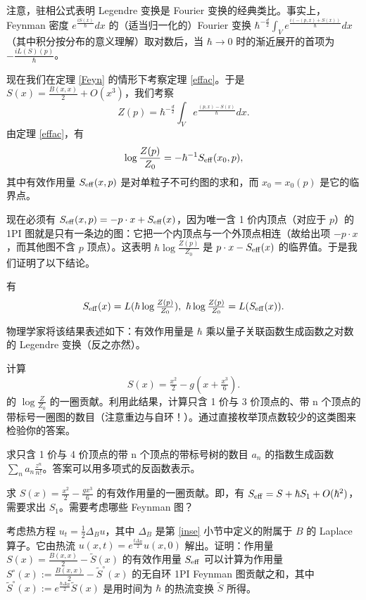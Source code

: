 注意，驻相公式表明 Legendre 变换是 Fourier 变换的经典类比。事实上，Feynman 密度 $e^{\frac{iS(x)}{\hbar}}dx$ 的（适当归一化的）Fourier 变换 $\hbar^{-\frac{d}{2}}\int_V e^{\frac{i(-(p,x)+S(x))}{\hbar}}dx$（其中积分按分布的意义理解）取对数后，当 $\hbar\to 0$ 时的渐近展开的首项为 $-\frac{iL(S)(p)}{\hbar}$。

现在我们在定理 \ref{Feyn} 的情形下考察定理 \ref{effac}。于是 $S(x)=\frac{B(x,x)}{2}+O(x^3)$，我们考察
$$
Z(p)=\hbar^{-\frac{d}{2}}\int_Ve^{\frac{(p,x)-S(x)}{\hbar}}dx.
$$
由定理 \ref{effac}，有
$$
\log\frac{Z(p)}{Z_0}=-\hbar^{-1}S_{\rm eff}(x_0,p),
$$
其中有效作用量 $S_{\rm eff}(x,p)$ 是对单粒子不可约图的求和，而 $x_0=x_0(p)$ 是它的临界点。

现在必须有 $S_{\rm eff}(x,p)=-p\cdot x+S_{\rm eff}(x)$，因为唯一含 1 价内顶点（对应于 $p$）的 1PI 图就是只有一条边的图：它把一个内顶点与一个外顶点相连（故给出项 $-p\cdot x$，而其他图不含 $p$ 顶点）。这表明 $\hbar\log\frac{Z(p)}{Z_0}$ 是 $p\cdot x-S_{\rm eff}(x)$ 的临界值。于是我们证明了以下结论。

\begin{proposition} 有
$$
S_{\rm eff}(x)=L(\hbar\log\tfrac{Z(p)}{Z_0}),\ \hbar\log\tfrac{Z(p)}{Z_0}=L(S_{\rm eff}(x)).
$$
\end{proposition}

物理学家将该结果表述如下：有效作用量是 $\hbar$ 乘以量子关联函数生成函数之对数的 Legendre 变换（反之亦然）。

\begin{exercise} 计算
$$
S(x)=\tfrac{x^2}{2}-g(x+\tfrac{x^3}{6}).
$$
的 $\log\frac{Z}{Z_0}$ 的一圈贡献。利用此结果，计算只含 1 价与 3 价顶点的、带 n 个顶点的带标号一圈图的数目（注意重边与自环！）。通过直接枚举顶点数较少的这类图来检验你的答案。
\end{exercise}

\begin{exercise}
求只含 1 价与 4 价顶点的带 n 个顶点的带标号树的数目 $a_n$ 的指数生成函数 $\sum_n a_n\frac{z^n}{n!}$。答案可以用多项式的反函数表示。
\end{exercise}

\begin{exercise} 求 $S(x)=\frac{x^2}{2}-\frac{gx^3}{6}$ 的有效作用量的一圈贡献。即，有 $S_{\rm eff}=S+\hbar S_1+O(\hbar^2)$，需要求出 $S_1$。需要考虑哪些 Feynman 图？
\end{exercise}

\begin{exercise} 考虑热方程 $u_t=\frac{1}{2}\Delta_B u$，其中 $\Delta_B$ 是第 \ref{inse} 小节中定义的附属于 $B$ 的 Laplace 算子。它由热流 $u(x,t)=e^{\frac{t\Delta_B}{2}}u(x,0)$ 解出。证明：作用量 $S(x)=\frac{B(x,x)}{2}-\widetilde S(x)$ 的有效作用量 $S_{\rm eff}$ 可以计算为作用量 $S^\circ(x):=\frac{B(x,x)}{2}-\widetilde S^\circ(x)$ 的无自环 1PI Feynman 图贡献之和，其中 $\widetilde S^\circ(x):=e^{\frac{\hbar\Delta_B}{2}}\widetilde S(x)$ 是用时间为 $\hbar$ 的热流变换 $\widetilde S$ 所得。
\end{exercise}

